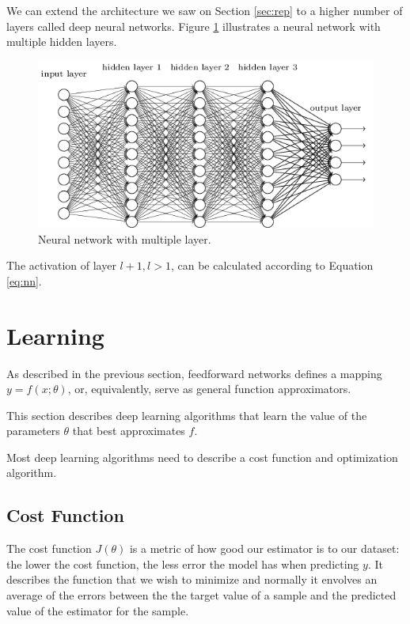 We can extend the architecture we saw on Section \ref{sec:rep} to a higher number of layers called
deep neural networks. Figure \ref{fig:deepnn} illustrates a neural network with multiple hidden layers.

\begin{figure}[h]
    \centering
    \includegraphics[width=1\textwidth]{Chapter3/deep_neural_net.png}
    \caption{Neural network with multiple layer.}
    \label{fig:deepnn}
\end{figure}

The activation of layer $l + 1, l > 1$, can be calculated according to Equation \ref{eq:nn}.

\section{Learning}

As described in the previous section, feedforward networks defines a mapping $y = f(x; \theta)$,
or, equivalently, serve as general function approximators.

This section describes deep learning algorithms that learn the value of the parameters $\theta$ that best approximates $f$.

Most deep learning algorithms need to describe a cost function and optimization algorithm.

\subsection{Cost Function}

The cost function $J(\theta)$ is a metric of how good our estimator is to our dataset: the lower the cost function, the less error
the model has when predicting $y$. It describes the function that we wish to minimize and normally it envolves an average of the errors
between the the target value of a sample and the predicted value of the estimator for the sample.

